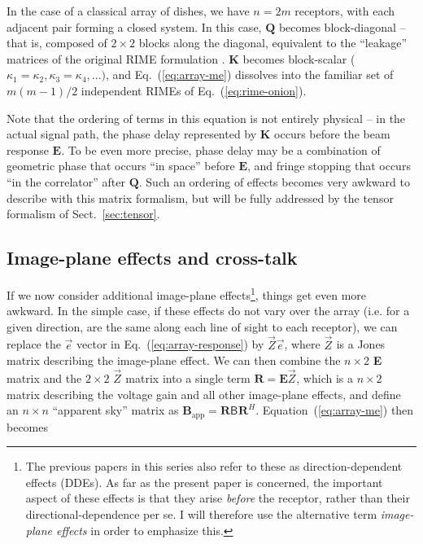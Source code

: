 \documentclass[]{aa}
\newcommand{\herm}{H}
\newcommand{\jones}[2]{\vec {#1}_{#2}}
\newcommand{\coh}[2]{\mathsf{{#1}}_{{#2}}}
\begin{document}
In the case of a classical array of dishes, we have $n=2m$ receptors, with each
adjacent pair forming a closed system. In this case, $\mathbf{Q}$ becomes block-diagonal -- that is, composed of $2\times2$ blocks along the diagonal, equivalent to the ``leakage'' matrices of the original RIME formulation \citep{ME1}. $\mathbf{K}$ becomes block-scalar ($\kappa_{1}=\kappa_{2},\kappa_{3}=\kappa_{4},...)$, and Eq.~(\ref{eq:array-me}) 
dissolves into the familiar set of $m(m-1)/2$ independent RIMEs of Eq.~(\ref{eq:rime-onion}).

Note that the ordering of terms in this equation is not entirely physical
-- in the actual signal path, the phase delay represented by $\mathbf{K}$
occurs before the beam response $\mathbf{E}$. To be even more precise, phase 
delay may be a combination of geometric phase that occurs ``in space'' before $\mathbf{E}$, and fringe stopping 
that occurs ``in the correlator'' after $\mathbf{Q}$. Such an ordering of effects 
becomes very awkward to describe with this matrix formalism,  
but will be fully addressed by the tensor formalism of Sect.~\ref{sec:tensor}.

\subsection{Image-plane effects and cross-talk}
\label{sec:matrix-image-plane}

If we now consider additional image-plane effects\footnote{The previous papers in this series \citep{RRIME1,RRIME2,RRIME3} also refer to these as direction-dependent effects (DDEs). As far as the present paper is concerned, the important aspect of these effects is that they arise \emph{before} the receptor, rather than their directional-dependence per se. I will therefore use the alternative term \emph{image-plane effects} in order to emphasize this.}, things get even more awkward. In the simple case,
if these effects do not vary over the array (i.e. for a given direction, are the same along each line of sight to each receptor), 
we can replace the $\vec e$ vector in Eq.~(\ref{eq:array-response}) by $\jones{Z}{}\vec e$, where $\jones{Z}{}$ is a Jones matrix
describing the image-plane effect. We can then combine the $n\times2$
\textbf{E} matrix and the $2\times2$ $\jones{Z}{}$ matrix into a single
term $\mathbf{R}=\mathbf{E}\jones{Z}{}$, which is a $n\times2$ matrix describing
the voltage gain and all other image-plane effects, and define an $n\times n$ ``apparent
sky'' matrix as $\mathbf{B}_\mathrm{app} = \mathbf{R} \coh{B}{} \mathbf{R}^\herm$.  
Equation~(\ref{eq:array-me}) then becomes
\end{document}
